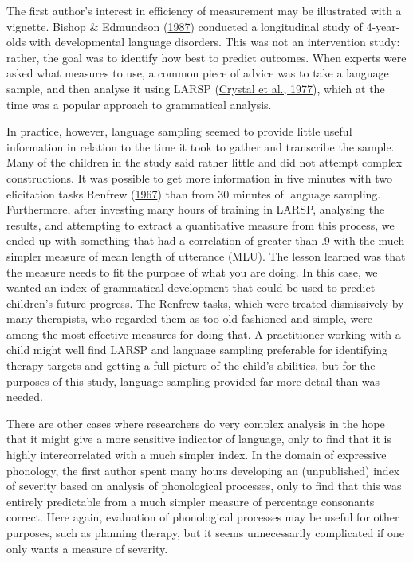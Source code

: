 \documentclass{krantz}
\begin{document}
The first author's interest in efficiency of measurement may be illustrated with a vignette. Bishop \& Edmundson (\protect\hyperlink{ref-bishop1987}{1987}) conducted a longitudinal study of 4-year-olds with developmental language disorders. This was not an intervention study: rather, the goal was to identify how best to predict outcomes. When experts were asked what measures to use, a common piece of advice was to take a language sample, and then analyse it using LARSP (\protect\hyperlink{ref-crystal1977}{Crystal et al., 1977}), which at the time was a popular approach to grammatical analysis.

In practice, however, language sampling seemed to provide little useful information in relation to the time it took to gather and transcribe the sample. Many of the children in the study said rather little and did not attempt complex constructions. It was possible to get more information in five minutes with two elicitation tasks Renfrew (\protect\hyperlink{ref-renfrew1967}{1967}) than from 30 minutes of language sampling. Furthermore, after investing many hours of training in LARSP, analysing the results, and attempting to extract a quantitative measure from this process, we ended up with something that had a correlation of greater than .9 with the much simpler measure of mean length of utterance (MLU). The lesson learned was that the measure needs to fit the purpose of what you are doing. In this case, we wanted an index of grammatical development that could be used to predict children's future progress. The Renfrew tasks, which were treated dismissively by many therapists, who regarded them as too old-fashioned and simple, were among the most effective measures for doing that. A practitioner working with a child might well find LARSP and language sampling preferable for identifying therapy targets and getting a full picture of the child's abilities, but for the purposes of this study, language sampling provided far more detail than was needed.

There are other cases where researchers do very complex analysis in the hope that it might give a more sensitive indicator of language, only to find that it is highly intercorrelated with a much simpler index. In the domain of expressive phonology, the first author spent many hours developing an (unpublished) index of severity based on analysis of phonological processes, only to find that this was entirely predictable from a much simpler measure of percentage consonants correct. Here again, evaluation of phonological processes may be useful for other purposes, such as planning therapy, but it seems unnecessarily complicated if one only wants a measure of severity.
\end{document}
